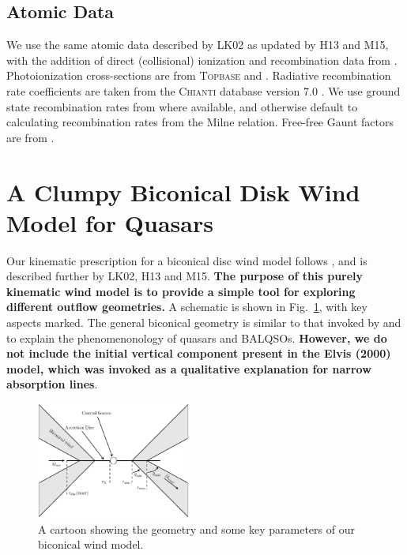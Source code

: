 \documentclass[useAMS,usenatbib]{mn2e_x}
\begin{document}
\subsection{Atomic Data}

We use the same atomic data  described by LK02 as updated by H13 and M15, 
with the addition of direct (collisional) ionization and recombination
data from \cite{dere2007}. 
Photoionization cross-sections are from \textsc{Topbase} \citep{cunto1993} and \cite{vfky}.
Radiative recombination rate coefficients are taken from 
the \textsc{Chianti} database version 7.0 \citep{dere1997,landi2012}.
We use ground state recombination rates from \cite{badnell2006} where available,
and otherwise default to calculating recombination rates from the Milne
relation. Free-free Gaunt factors are from \cite{sutherland1998}.


%
%

\section{A Clumpy Biconical Disk Wind Model for Quasars}

Our kinematic prescription for a biconical disc wind model
follows \cite{SV93}, and is described further by
LK02, H13 and M15. {\bf The purpose of this
purely kinematic wind model is to provide a simple tool for 
exploring different outflow geometries.}
A schematic is shown in Fig.~\ref{fig:cartoon},
with key aspects marked. The general biconical
geometry is similar to that invoked by \cite{MCGV95} and 
\cite{elvis2000} to explain the phenomenonology
of quasars and BALQSOs. {\bf However, we do not include the initial
vertical component present in the Elvis (2000) model, which was
invoked as a qualitative explanation for narrow absorption lines}.

\begin{figure} 
\centering
\includegraphics[width=0.45\textwidth]{figures/fig1.eps}
\caption
{
A cartoon showing the geometry and some key parameters of
our biconical wind model.
}
\label{fig:cartoon}
\end{figure} 
\end{document}
